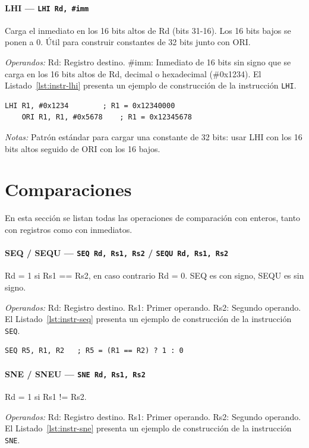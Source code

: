 \documentclass[../main.tex]{subfiles}
\begin{document}
\paragraph*{LHI --- \texttt{LHI Rd, \#imm}}
Carga el inmediato en los 16 bits altos de Rd (bits 31-16). Los 16 bits bajos se ponen a 0. Útil para construir constantes de 32 bits junto con ORI.

\textit{Operandos:} Rd: Registro destino. \#imm: Inmediato de 16 bits sin signo que se carga en los 16 bits altos de Rd, decimal o hexadecimal (\#0x1234).
El Listado~\ref{lst:instr-lhi} presenta un ejemplo de construcción de la instrucción \texttt{LHI}.

\begin{lstlisting}[caption={LHI},label={lst:instr-lhi}]
	LHI R1, #0x1234        ; R1 = 0x12340000
	ORI R1, R1, #0x5678    ; R1 = 0x12345678
\end{lstlisting}
\textit{Notas:} Patrón estándar para cargar una constante de 32 bits: usar LHI con los 16 bits altos seguido de ORI con los 16 bajos.

\section{Comparaciones}

En esta sección se listan todas las operaciones de comparación con enteros, tanto con registros como con inmediatos.

\paragraph*{SEQ / SEQU --- \texttt{SEQ Rd, Rs1, Rs2} / \texttt{SEQU Rd, Rs1, Rs2}}
Rd = 1 si Rs1 == Rs2, en caso contrario Rd = 0. SEQ es con signo, SEQU es sin signo.

\textit{Operandos:} Rd: Registro destino. Rs1: Primer operando. Rs2: Segundo operando.
El Listado~\ref{lst:instr-seq} presenta un ejemplo de construcción de la instrucción \texttt{SEQ}.

\begin{lstlisting}[caption={SEQ},label={lst:instr-seq}]
	SEQ R5, R1, R2   ; R5 = (R1 == R2) ? 1 : 0
\end{lstlisting}

\paragraph*{SNE / SNEU --- \texttt{SNE Rd, Rs1, Rs2}}
Rd = 1 si Rs1 != Rs2.

\textit{Operandos:} Rd: Registro destino. Rs1: Primer operando. Rs2: Segundo operando.
El Listado~\ref{lst:instr-sne} presenta un ejemplo de construcción de la instrucción \texttt{SNE}.
\end{document}

